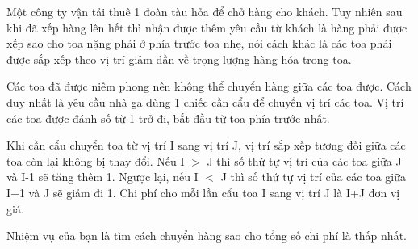 Một công ty vận tải thuê 1 đoàn tàu hỏa để chở hàng cho khách. Tuy nhiên sau khi đã xếp hàng lên hết thì nhận được thêm yêu cầu từ khách là hàng phải được xếp sao cho toa nặng phải ở phía trước toa nhẹ, nói cách khác là các toa phải được sắp xếp theo vị trí giảm dần về trọng lượng hàng hóa trong toa.  

   Các toa đã được niêm phong nên không thể chuyển hàng giữa các toa được. Cách duy nhất là yêu cầu nhà ga dùng 1 chiếc cần cẩu để chuyển vị trí các toa. Vị trí các toa được đánh số từ 1 trở đi, bắt đầu từ toa phía trước nhất.  

   Khi cần cẩu chuyển toa từ vị trí I sang vị trí J, vị trí sắp xếp tương đối giữa các toa còn lại không bị thay đổi. Nếu I $>$ J thì số thứ tự vị trí của các toa giữa J và I-1 sẽ tăng thêm 1. Ngược lại, nếu I $<$ J thì số thứ tự vị trí của các toa giữa I+1 và J sẽ giảm đi 1. Chi phí cho mỗi lần cẩu toa I sang vị trí J là I+J đơn vị giá.  

   Nhiệm vụ của bạn là tìm cách chuyển hàng sao cho tổng số chi phí là thấp nhất.